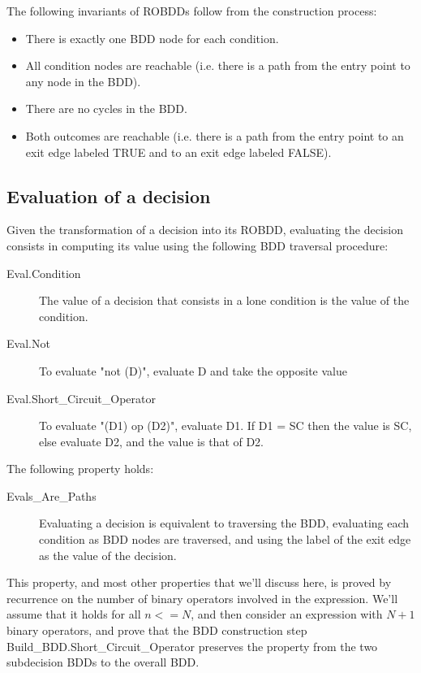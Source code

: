 \documentclass[a4paper,12pt,twoside]{article}
\begin{document}
The following invariants of ROBDDs follow from the construction process:
\begin{itemize}
  \item There is exactly one BDD node for each condition.
  \item All condition nodes are reachable (i.e. there is a path from
        the entry point to any node in the BDD).
  \item There are no cycles in the BDD.
  \item Both outcomes are reachable (i.e. there is a path from the entry point
        to an exit edge labeled TRUE and to an exit edge labeled FALSE).
\end{itemize}

\subsection{Evaluation of a decision}

Given the transformation of a decision into its ROBDD, evaluating the
decision consists in computing its value using the following BDD traversal
procedure:

\begin{description}
\item[Eval.Condition]
  The value of a decision that consists in a lone condition is the
  value of the condition.

\item[Eval.Not]
  To evaluate "not (D)", evaluate D and take the opposite value

\item[Eval.Short\_Circuit\_Operator]
  To evaluate "(D1) op (D2)", evaluate D1. If D1 = SC then the
  value is SC, else evaluate D2, and the value is that of D2.
\end{description}

The following property holds:

\begin{description}
\item[Evals\_Are\_Paths]
  Evaluating a decision is equivalent to traversing the BDD, evaluating
  each condition as BDD nodes are traversed, and using the label of the
  exit edge as the value of the decision.
\end{description}

This property, and most other properties that we'll discuss here,
is proved by recurrence on the number of binary operators involved in
the expression. We'll assume that it holds for all $n <= N$, and then
consider an expression with $N+1$ binary operators, and prove that
the BDD construction step Build\_BDD.Short\_Circuit\_Operator preserves
the property from the two subdecision BDDs to the overall BDD.
\end{document}

